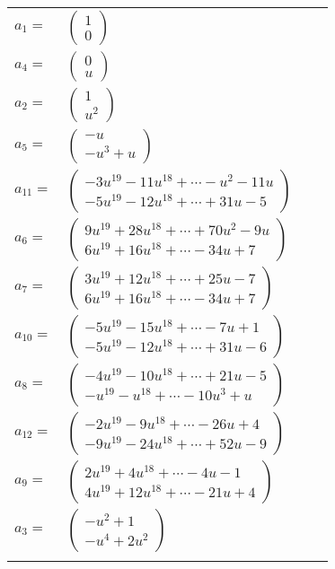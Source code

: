 \documentclass[1p]{elsarticle_modified}
\theoremstyle{definition}
\begin{document}
\begin{tabular}{m{7pt} m{180pt} m{7pt} m{180pt} }
\flushright $a_{1}=$&$\begin{pmatrix}1\\0\end{pmatrix}$ \\
\flushright $a_{4}=$&$\begin{pmatrix}0\\u\end{pmatrix}$ \\
\flushright $a_{2}=$&$\begin{pmatrix}1\\u^2\end{pmatrix}$ \\
\flushright $a_{5}=$&$\begin{pmatrix}- u\\- u^3+u\end{pmatrix}$ \\
\flushright $a_{11}=$&$\begin{pmatrix}-3 u^{19}-11 u^{18}+\cdots- u^2-11 u\\-5 u^{19}-12 u^{18}+\cdots+31 u-5\end{pmatrix}$ \\
\flushright $a_{6}=$&$\begin{pmatrix}9 u^{19}+28 u^{18}+\cdots+70 u^2-9 u\\6 u^{19}+16 u^{18}+\cdots-34 u+7\end{pmatrix}$ \\
\flushright $a_{7}=$&$\begin{pmatrix}3 u^{19}+12 u^{18}+\cdots+25 u-7\\6 u^{19}+16 u^{18}+\cdots-34 u+7\end{pmatrix}$ \\
\flushright $a_{10}=$&$\begin{pmatrix}-5 u^{19}-15 u^{18}+\cdots-7 u+1\\-5 u^{19}-12 u^{18}+\cdots+31 u-6\end{pmatrix}$ \\
\flushright $a_{8}=$&$\begin{pmatrix}-4 u^{19}-10 u^{18}+\cdots+21 u-5\\- u^{19}- u^{18}+\cdots-10 u^3+u\end{pmatrix}$ \\
\flushright $a_{12}=$&$\begin{pmatrix}-2 u^{19}-9 u^{18}+\cdots-26 u+4\\-9 u^{19}-24 u^{18}+\cdots+52 u-9\end{pmatrix}$ \\
\flushright $a_{9}=$&$\begin{pmatrix}2 u^{19}+4 u^{18}+\cdots-4 u-1\\4 u^{19}+12 u^{18}+\cdots-21 u+4\end{pmatrix}$ \\
\flushright $a_{3}=$&$\begin{pmatrix}- u^2+1\\- u^4+2 u^2\end{pmatrix}$\\&\end{tabular}
\end{document}
